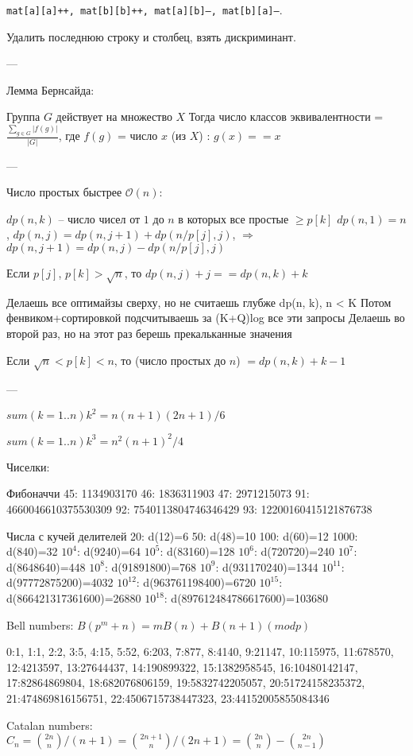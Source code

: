 	\texttt{mat[a][a]++, mat[b][b]++, mat[a][b]--, mat[b][a]--}.
	
	Удалить последнюю строку и столбец, взять дискриминант.
	
---

Лемма Бернсайда:

Группа $G$ действует на множество $X$
Тогда число классов эквивалентности = $\frac{\sum_{g \in G} {|f(g)|}}{|G|}$,
где $f(g)$ = число $x$ (из $X$) : $g(x) == x$

---

Число простых быстрее $\mathcal{O}(n)$: 

$dp(n, k)$ -- число чисел от $1$ до $n$ в которых все простые $\ge p[k]$
$dp(n, 1) = n$, $dp(n, j) = dp(n, j + 1) + dp(n / p[j], j)$, $\Rightarrow$ $dp(n, j + 1) = dp(n, j) - dp(n / p[j], j)$

Если $p[j]$, $p[k] > \sqrt{n}$, то $dp(n, j) + j == dp(n, k) + k$

Делаешь все оптимайзы сверху, но не считаешь глубже dp(n, k), n < K
Потом фенвиком+сортировкой подсчитываешь за (K+Q)log все эти запросы
Делаешь во второй раз, но на этот раз берешь прекальканные значения

Если $\sqrt{n} < p[k] < n$, то (число простых до $n$) $= dp(n, k) + k - 1$

---

$sum(k=1..n) k^2 = n(n+1)(2n+1)/6$

$sum(k=1..n) k^3 = n^2(n+1)^2/4$


Чиселки: 

Фибоначчи
45:  1134903170
46:  1836311903
47:  2971215073
91:  4660046610375530309
92:  7540113804746346429
93:  12200160415121876738

Числа с кучей делителей
20: d(12)=6
50: d(48)=10
100: d(60)=12
1000: d(840)=32
$10^4$: d(9240)=64
$10^5$: d(83160)=128
$10^6$: d(720720)=240
$10^7$: d(8648640)=448
$10^8$: d(91891800)=768
$10^9$: d(931170240)=1344
$10^{11}$: d(97772875200)=4032
$10^{12}$: d(963761198400)=6720
$10^{15}$: d(866421317361600)=26880
$10^{18}$: d(897612484786617600)=103680

Bell numbers:
$B(p^m + n) = mB(n) + B(n + 1) (mod p)$

0:1, 1:1, 2:2, 3:5, 4:15, 5:52, 6:203, 7:877, 8:4140, 9:21147,
10:115975, 11:678570, 12:4213597, 13:27644437, 14:190899322,
15:1382958545, 16:10480142147, 17:82864869804, 18:682076806159,
19:5832742205057, 20:51724158235372, 21:474869816156751,
22:4506715738447323, 23:44152005855084346

Catalan numbers:
$C_n = \binom{2n}{n} / (n + 1) = \binom{2n + 1}{n} / (2n + 1) = \binom{2n}{n} - \binom{2n}{n - 1}$

